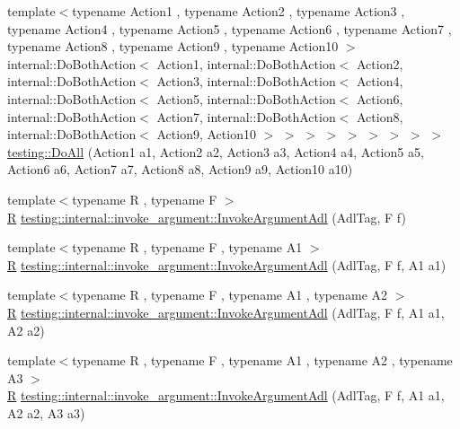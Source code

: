 \begin{DoxyCompactItemize}
\item 
{\footnotesize template$<$typename Action1 , typename Action2 , typename Action3 , typename Action4 , typename Action5 , typename Action6 , typename Action7 , typename Action8 , typename Action9 , typename Action10 $>$ }\\internal\+::\+Do\+Both\+Action$<$ Action1, internal\+::\+Do\+Both\+Action$<$ Action2, internal\+::\+Do\+Both\+Action$<$ Action3, internal\+::\+Do\+Both\+Action$<$ Action4, internal\+::\+Do\+Both\+Action$<$ Action5, internal\+::\+Do\+Both\+Action$<$ Action6, internal\+::\+Do\+Both\+Action$<$ Action7, internal\+::\+Do\+Both\+Action$<$ Action8, internal\+::\+Do\+Both\+Action$<$ Action9, Action10 $>$ $>$ $>$ $>$ $>$ $>$ $>$ $>$ $>$ \hyperlink{namespacetesting_a79ac222c485c7aa0a1774bee17dadb10}{testing\+::\+Do\+All} (Action1 a1, Action2 a2, Action3 a3, Action4 a4, Action5 a5, Action6 a6, Action7 a7, Action8 a8, Action9 a9, Action10 a10)
\item 
{\footnotesize template$<$typename R , typename F $>$ }\\\hyperlink{typedefs__9_8js_afb423b73ee7b6c04d2d54fc06e405404}{R} \hyperlink{namespacetesting_1_1internal_1_1invoke__argument_a003f0228357c54422037bd3b448b355a}{testing\+::internal\+::invoke\+\_\+argument\+::\+Invoke\+Argument\+Adl} (Adl\+Tag, F f)
\item 
{\footnotesize template$<$typename R , typename F , typename A1 $>$ }\\\hyperlink{typedefs__9_8js_afb423b73ee7b6c04d2d54fc06e405404}{R} \hyperlink{namespacetesting_1_1internal_1_1invoke__argument_af07db25fc1b7486fb991495863bf1ab8}{testing\+::internal\+::invoke\+\_\+argument\+::\+Invoke\+Argument\+Adl} (Adl\+Tag, F f, A1 a1)
\item 
{\footnotesize template$<$typename R , typename F , typename A1 , typename A2 $>$ }\\\hyperlink{typedefs__9_8js_afb423b73ee7b6c04d2d54fc06e405404}{R} \hyperlink{namespacetesting_1_1internal_1_1invoke__argument_afe4a6811c2bcd0c6c51194b95e224f73}{testing\+::internal\+::invoke\+\_\+argument\+::\+Invoke\+Argument\+Adl} (Adl\+Tag, F f, A1 a1, A2 a2)
\item 
{\footnotesize template$<$typename R , typename F , typename A1 , typename A2 , typename A3 $>$ }\\\hyperlink{typedefs__9_8js_afb423b73ee7b6c04d2d54fc06e405404}{R} \hyperlink{namespacetesting_1_1internal_1_1invoke__argument_ae5e7bcffcae6a29e9c66298ead5ee91b}{testing\+::internal\+::invoke\+\_\+argument\+::\+Invoke\+Argument\+Adl} (Adl\+Tag, F f, A1 a1, A2 a2, A3 a3)

\end{DoxyCompactItemize}
